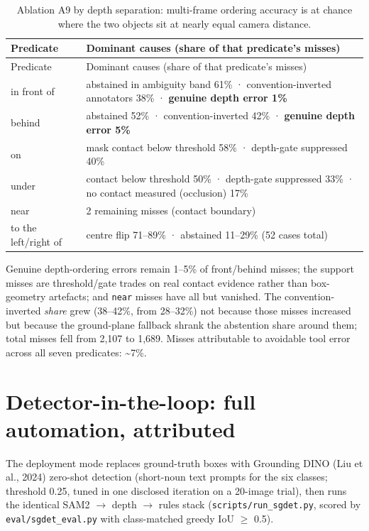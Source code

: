 \begin{center}
\small
\begin{longtable}{ll}
\caption{Ablation A9 by depth separation: multi-frame ordering accuracy is at chance where the two objects sit at nearly equal camera distance.}\\
\hline
Predicate & Dominant causes (share of that predicate's misses) \\
\hline
\endfirsthead
\hline
Predicate & Dominant causes (share of that predicate's misses) \\
\hline
\endhead
in front of & abstained in ambiguity band 61\% · convention-inverted annotators 38\% · \textbf{genuine depth error 1\%} \\
behind & abstained 52\% · convention-inverted 42\% · \textbf{genuine depth error 5\%} \\
on & mask contact below threshold 58\% · depth-gate suppressed 40\% \\
under & contact below threshold 50\% · depth-gate suppressed 33\% · no contact measured (occlusion) 17\% \\
near & 2 remaining misses (contact boundary) \\
to the left/right of & centre flip 71--89\% · abstained 11--29\% (52 cases total) \\
\hline
\end{longtable}
\end{center}

Genuine depth-ordering errors remain 1--5\% of front/behind misses; the support misses are threshold/gate trades on real contact evidence rather than box-geometry artefacts; and \texttt{near} misses have all but vanished. The convention-inverted \textit{share} grew (38--42\%, from 28--32\%) not because those misses increased but because the ground-plane fallback shrank the abstention share around them; total misses fell from 2,107 to 1,689. Misses attributable to avoidable tool error across all seven predicates: \textasciitilde{}7\%.


\section{Detector-in-the-loop: full automation, attributed}

The deployment mode replaces ground-truth boxes with Grounding DINO (Liu et al., 2024) zero-shot detection (short-noun text prompts for the six classes; threshold 0.25, tuned in one disclosed iteration on a 20-image trial), then runs the identical SAM2 $\rightarrow$ depth $\rightarrow$ rules stack (\texttt{scripts/run\_sgdet.py}, scored by \texttt{eval/sgdet\_eval.py} with class-matched greedy IoU $\geq$ 0.5).

